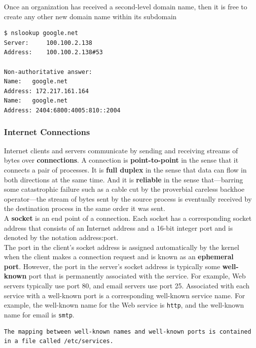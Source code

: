 \documentclass[11pt]{article}
\begin{document}
Once an organization has received a second-level domain name, then it is free to create any other new domain name within its subdomain\\


\begin{verbatim}
$ nslookup google.net
Server:		100.100.2.138
Address:	100.100.2.138#53

Non-authoritative answer:
Name:	google.net
Address: 172.217.161.164
Name:	google.net
Address: 2404:6800:4005:810::2004
\end{verbatim}


\subsubsection{Internet Connections}
\label{sec:org0afc9e2}
Internet clients and servers communicate by sending and receiving streams of bytes over \textbf{connections}. A connection is \textbf{point-to-point} in the sense that it connects a pair of processes. It is \textbf{full duplex} in the sense that data can flow in both directions at the same time. And it is \textbf{reliable} in the sense that—barring some catastrophic failure such as a cable cut by the proverbial careless backhoe operator—the stream of bytes sent by the source process is eventually received by the destination process in the same order it was sent.\\


A \textbf{socket} is an end point of a connection. Each socket has a corresponding socket address that consists of an Internet address and a 16-bit integer port and is denoted by the notation address:port.\\

The port in the client’s socket address is assigned automatically by the kernel when the client makes a connection request and is known as an \textbf{ephemeral port}. However, the port in the server’s socket address is typically some \textbf{well-known} port that is permanently associated with the service. For example, Web servers typically use port 80, and email servers use port 25. Associated with each service with a well-known port is a corresponding well-known service name. For example, the well-known name for the Web service is \texttt{http}, and the well-known name for email is \texttt{smtp}.\\

\begin{verbatim}
The mapping between well-known names and well-known ports is contained in a file called /etc/services.
\end{verbatim}
\end{document}
